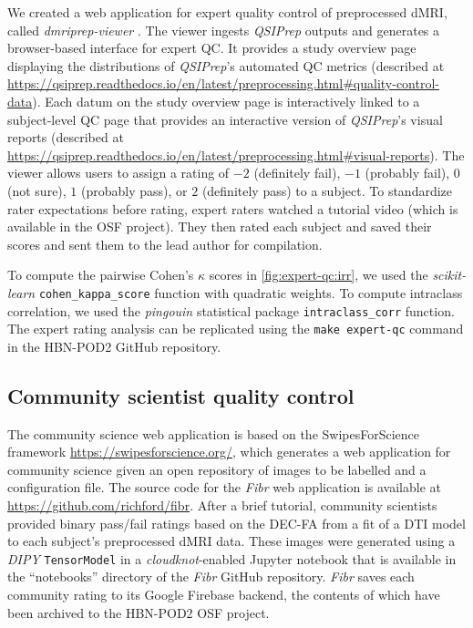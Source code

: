\documentclass[fleqn,10pt]{wlscirep}
\begin{document}
We created a web application for expert quality control of preprocessed dMRI,
called \emph{dmriprep-viewer} \cite{richie-halford2021-viewer}. The viewer
ingests \emph{QSIPrep} outputs and generates a browser-based interface for
expert QC. It provides a study overview page displaying the distributions of
\emph{QSIPrep}'s automated QC metrics (described at
\url{https://qsiprep.readthedocs.io/en/latest/preprocessing.html#quality-control-data}).
Each datum on the study overview page is interactively linked to a subject-level
QC page that provides an interactive version of \emph{QSIPrep}'s visual reports
(described at
\url{https://qsiprep.readthedocs.io/en/latest/preprocessing.html#visual-reports}).
The viewer allows users to assign a rating of $-2$ (definitely fail), $-1$
(probably fail), $0$ (not sure), $1$ (probably pass), or $2$ (definitely pass) to a
subject. To standardize rater expectations before rating, expert raters watched
a tutorial video (which is available in the OSF project). They then rated each
subject and saved their scores and sent them to the lead author for compilation.


To compute the pairwise Cohen's $\kappa$ scores in \ref{fig:expert-qc:irr}, we
used the \emph{scikit-learn} \cite{scikit-learn} \texttt{cohen\_kappa\_score}
function with quadratic weights. To compute intraclass correlation, we used the
\emph{pingouin} statistical package \cite{vallat2018pingouin}
\texttt{intraclass\_corr} function. The expert rating analysis can be replicated
using the \texttt{make expert-qc} command in the HBN-POD2 GitHub repository.

\subsection*{Community scientist quality control}

The community science web application is based on the SwipesForScience framework
\url{https://swipesforscience.org/}, which generates a web application for
community science given an open repository of images to be labelled and a
configuration file. The source code for the \emph{Fibr} web application is
available at \url{https://github.com/richford/fibr}. After a brief tutorial,
community scientists provided binary pass/fail ratings based on the DEC-FA from
a fit of a DTI model to each subject's preprocessed dMRI data. These images were
generated using a \emph{DIPY} \cite{dipy} \texttt{TensorModel} in a
\emph{cloudknot}-enabled Jupyter notebook that is available in the ``notebooks''
directory of the \emph{Fibr} GitHub repository. \emph{Fibr} saves each community
rating to its Google Firebase backend, the contents of which have been archived
to the HBN-POD2 OSF project.
\end{document}
